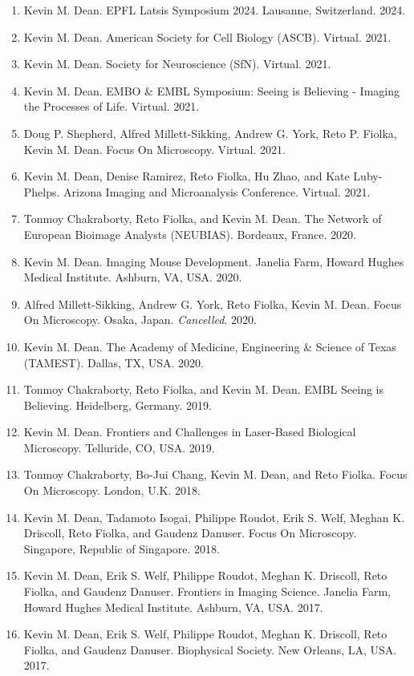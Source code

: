 \begin{enumerate}
\item Kevin M. Dean.  EPFL Latsis Symposium 2024. Lausanne, Switzerland. 2024.
\item Kevin M. Dean.  American Society for Cell Biology (ASCB). Virtual. 2021.
\item Kevin M. Dean.  Society for Neuroscience (SfN). Virtual. 2021.
\item Kevin M. Dean.  EMBO \& EMBL Symposium: Seeing is Believing - Imaging the Processes of Life.  Virtual.  2021.
\item Doug P. Shepherd, Alfred Millett-Sikking, Andrew G. York, Reto P. Fiolka, Kevin M. Dean.  Focus On Microscopy. Virtual. 2021.
\item Kevin M. Dean, Denise Ramirez, Reto Fiolka, Hu Zhao, and Kate Luby-Phelps. Arizona Imaging and Microanalysis Conference. Virtual. 2021.
\item Tonmoy Chakraborty, Reto Fiolka, and Kevin M. Dean.  The Network of European Bioimage Analysts (NEUBIAS).  Bordeaux, France. 2020.
\item Kevin M. Dean.  Imaging Mouse Development.  Janelia Farm, Howard Hughes Medical Institute.  Ashburn, VA, USA. 2020.
\item Alfred Millett-Sikking, Andrew G. York, Reto Fiolka, Kevin M. Dean.  Focus On Microscopy.  Osaka, Japan. {\it Cancelled}. 2020.
\item Kevin M. Dean.  The Academy of Medicine, Engineering \& Science of Texas (TAMEST).  Dallas, TX, USA. 2020.
\item Tonmoy Chakraborty, Reto Fiolka, and Kevin M. Dean.  EMBL Seeing is Believing. Heidelberg, Germany. 2019.
\item Kevin M. Dean. Frontiers and Challenges in Laser-Based Biological Microscopy. Telluride, CO, USA. 2019.
\item Tonmoy Chakraborty, Bo-Jui Chang, Kevin M. Dean, and Reto Fiolka.  Focus On Microscopy.  London, U.K.  2018.
\item Kevin M. Dean, Tadamoto Isogai, Philippe Roudot, Erik S. Welf, Meghan K. Driscoll, Reto Fiolka, and Gaudenz Danuser.  Focus On Microscopy.  Singapore, Republic of Singapore. 2018.
\item Kevin M. Dean, Erik S. Welf, Philippe Roudot, Meghan K. Driscoll, Reto Fiolka, and Gaudenz Danuser.  Frontiers in Imaging Science.  Janelia Farm, Howard Hughes Medical Institute.  Ashburn, VA, USA.  2017.
\item Kevin M. Dean, Erik S. Welf, Philippe Roudot, Meghan K. Driscoll, Reto Fiolka, and Gaudenz Danuser.  Biophysical Society.  New Orleans, LA, USA. 2017.

\end{enumerate}
